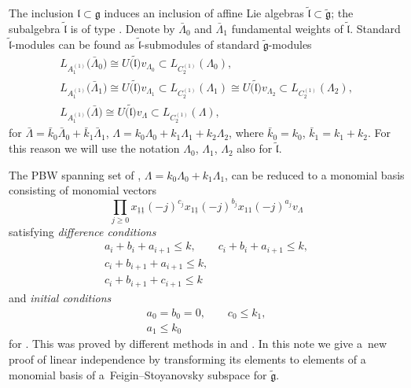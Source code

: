 \documentclass[10pt,a4paper]{amsart}
\newcommand{\g}
{{\mathfrak g}}
\newcommand{\lgg}
{{\mathfrak l}}
\newcommand{\lggt}
{\tilde{\mathfrak l}}
\newcommand{\gt}
{\tilde{{\mathfrak g}}}
\numberwithin{equation}{section}
\begin{document}
The inclusion $\lgg\subset\g$ induces an inclusion of affine Lie algebras $\lggt\subset\gt$; the subalgebra $\lggt$ is of type . Denote by $\bar{\Lambda}_0$ and $\bar{\Lambda}_1$ fundamental weights of $\lggt$. Standard $\lggt$-modules can be found as $\lggt$-submodules of standard $\gt$-modules
\begin{gather*}
	L_{A_1^{(1)}} \bigl(\bar{\Lambda}_0\bigr)  \cong U\bigl(\lggt\bigr)v_{\Lambda_0} \subset L_{C_2^{(1)}} (\Lambda_0), \\	
	L_{A_1^{(1)}} \bigl(\bar{\Lambda}_1\bigr)  \cong U\bigl(\lggt\bigr)v_{\Lambda_1} \subset L_{C_2^{(1)}} (\Lambda_1)
	 \cong U\bigl(\lggt\bigr)v_{\Lambda_2} \subset L_{C_2^{(1)}} (\Lambda_2), \\ 	
	L_{A_1^{(1)}} \bigl(\bar{\Lambda}\bigr)  \cong U\bigl(\lggt\bigr)v_{\Lambda} \subset L_{C_2^{(1)}}(\Lambda), 	
\end{gather*}
for $\bar{\Lambda} = \bar{k}_0 \bar{\Lambda}_0 + \bar{k}_1 \bar{\Lambda}_1$,
$\Lambda = k_0 \Lambda_0 + k_1 \Lambda_1+ k_2 \Lambda_2$, where $\bar{k}_0=k_0$,
 $\bar{k}_1=k_1+k_2$.
For this reason we will use the notation
$\Lambda_0$, $\Lambda_1$, $\Lambda_2$ also for $\lggt$.


The PBW spanning set of ,
$\Lambda = k_0 \Lambda_0 + k_1 \Lambda_1$,
 can be reduced to a monomial basis consisting of monomial vectors
\begin{equation} \label{upi}
	\prod_{j\geq 0} x_{\underline{1}\underline{1}}(-j)^{c_j} x_{1 \underline{1}}(-j)^{b_j} x_{11} (-j)^{a_j} v_\Lambda
\end{equation}
satisfying {\em difference conditions}
\begin{gather}
	\label{DCA1} 	
	a_i +b_i+a_{i+1}\leq k ,	\qquad
	c_i +b_i+a_{i+1}\leq k 	,\\
	\label{DCA1.5} c_i +b_{i+1}+a_{i+1}\leq k ,	\\
	\label{DCA2}	c_i +b_{i+1}+c_{i+1}\leq k 	
\end{gather}
and {\em initial conditions}
\begin{gather}
a_0=b_0  = 0,\qquad
	c_0 \leq k_1	,\label{ICA1} \\
a_1 \leq k_0	\label{ICA2}
\end{gather}
for .
%
 This was proved by different methods in \cite{MP} and \cite{FKLMM}. In this note we give a~new proof of linear independence by transforming its elements to elements of a monomial basis of a~Feigin--Stoyanovsky subspace for $\gt$.
\end{document}
